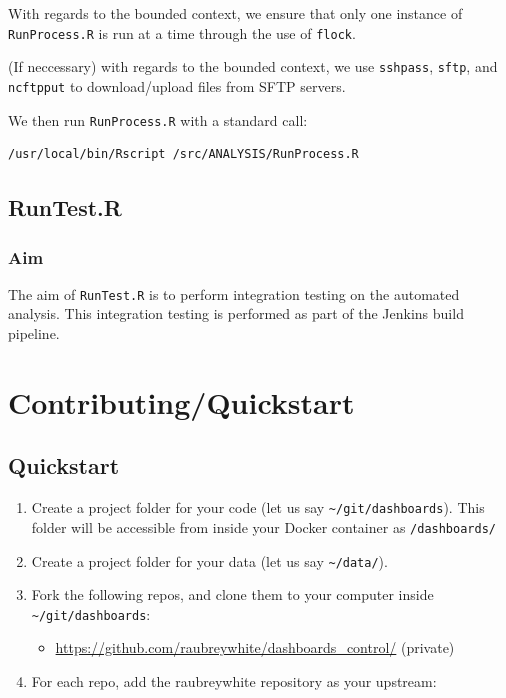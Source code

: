 \documentclass[12pt,]{article}
\providecommand{\tightlist}{%
  \setlength{\itemsep}{0pt}\setlength{\parskip}{0pt}}
\begin{document}
With regards to the bounded context, we ensure that only one instance of
\texttt{RunProcess.R} is run at a time through the use of
\texttt{flock}.

(If neccessary) with regards to the bounded context, we use
\texttt{sshpass}, \texttt{sftp}, and \texttt{ncftpput} to
download/upload files from SFTP servers.

We then run \texttt{RunProcess.R} with a standard call:

\begin{verbatim}
/usr/local/bin/Rscript /src/ANALYSIS/RunProcess.R
\end{verbatim}

\subsection{RunTest.R}\label{runtest.r}

\subsubsection{Aim}\label{aim-2}

The aim of \texttt{RunTest.R} is to perform integration testing on the
automated analysis. This integration testing is performed as part of the
Jenkins build pipeline.

\section{Contributing/Quickstart}\label{contributingquickstart}

\hypertarget{quickstart}{\subsection{Quickstart}\label{quickstart}}

\begin{enumerate}
\def\labelenumi{\arabic{enumi}.}
\tightlist
\item
  Create a project folder for your code (let us say
  \texttt{\textasciitilde{}/git/dashboards}). This folder will be
  accessible from inside your Docker container as \texttt{/dashboards/}
\item
  Create a project folder for your data (let us say
  \texttt{\textasciitilde{}/data/}).
\item
  Fork the following repos, and clone them to your computer inside
  \texttt{\textasciitilde{}/git/dashboards}:

  \begin{itemize}
  \tightlist
  \item
    \url{https://github.com/raubreywhite/dashboards_control/} (private)
  \end{itemize}
\item
  For each repo, add the raubreywhite repository as your upstream:
\end{enumerate}
\end{document}
